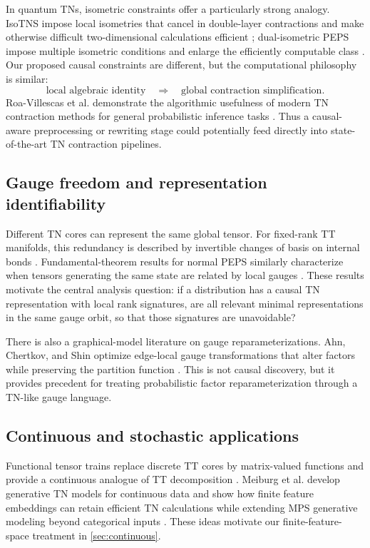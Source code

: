 \documentclass[11pt]{article}
\theoremstyle{remark}
\begin{document}
In quantum TNs, isometric constraints offer a particularly strong analogy. IsoTNS impose local isometries that cancel in double-layer contractions and make otherwise difficult two-dimensional calculations efficient \cite{zaletel2020isometric}; dual-isometric PEPS impose multiple isometric conditions and enlarge the efficiently computable class \cite{yu2024dual}. Our proposed causal constraints are different, but the computational philosophy is similar:
\begin{equation}
\text{local algebraic identity}\quad\Longrightarrow\quad\text{global contraction simplification}.
\end{equation}
Roa-Villescas et al. demonstrate the algorithmic usefulness of modern TN contraction methods for general probabilistic inference tasks \cite{roavillescas2024probabilistic}. Thus a causal-aware preprocessing or rewriting stage could potentially feed directly into state-of-the-art TN contraction pipelines.

\subsection{Gauge freedom and representation identifiability}

Different TN cores can represent the same global tensor. For fixed-rank TT manifolds, this redundancy is described by invertible changes of basis on internal bonds \cite{holtz2012manifolds}. Fundamental-theorem results for normal PEPS similarly characterize when tensors generating the same state are related by local gauges \cite{molnar2018normal}. These results motivate the central analysis question: if a distribution has a causal TN representation with local rank signatures, are all relevant minimal representations in the same gauge orbit, so that those signatures are unavoidable?

There is also a graphical-model literature on gauge reparameterizations. Ahn, Chertkov, and Shin optimize edge-local gauge transformations that alter factors while preserving the partition function \cite{ahn2017gauging}. This is not causal discovery, but it provides precedent for treating probabilistic factor reparameterization through a TN-like gauge language.

\subsection{Continuous and stochastic applications}

Functional tensor trains replace discrete TT cores by matrix-valued functions and provide a continuous analogue of TT decomposition \cite{gorodetsky2019functional}. Meiburg et al. develop generative TN models for continuous data and show how finite feature embeddings can retain efficient TN calculations while extending MPS generative modeling beyond categorical inputs \cite{meiburg2025continuous}. These ideas motivate our finite-feature-space treatment in \cref{sec:continuous}.
\end{document}
